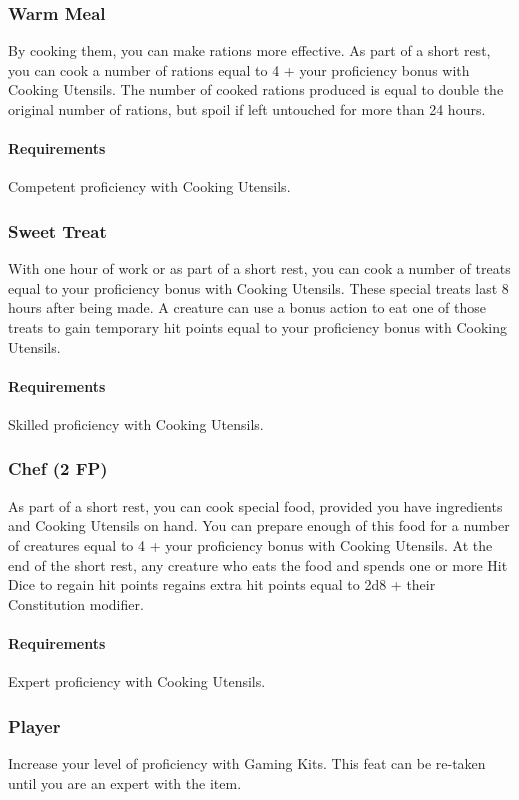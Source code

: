 \subsubsection{Warm Meal} \label{feat::warmmeal}
    By cooking them, you can make rations more effective.
    As part of a short rest, you can cook a number of rations equal to 4 + your proficiency bonus with Cooking Utensils.
    The number of cooked rations produced is equal to double the original number of rations, but spoil if left untouched for more than 24 hours.
    \paragraph{Requirements} Competent proficiency with Cooking Utensils.
\subsubsection{Sweet Treat} \label{feat::sweettreat}
    With one hour of work or as part of a short rest, you can cook a number of treats equal to your proficiency bonus with Cooking Utensils.
    These special treats last 8 hours after being made.
    A creature can use a bonus action to eat one of those treats to gain temporary hit points equal to your proficiency bonus with Cooking Utensils.
    \paragraph{Requirements} Skilled proficiency with Cooking Utensils.
\subsubsection{Chef (2 FP)} \label{feat::chef}
    As part of a short rest, you can cook special food, provided you have ingredients and Cooking Utensils on hand.
    You can prepare enough of this food for a number of creatures equal to 4 + your proficiency bonus with Cooking Utensils.
    At the end of the short rest, any creature who eats the food and spends one or more Hit Dice to regain hit points regains extra hit points equal to 2d8 + their Constitution modifier.
    \paragraph{Requirements} Expert proficiency with Cooking Utensils.
\subsubsection{Player} \label{feat::player}
    Increase your level of proficiency with Gaming Kits.
    This feat can be re-taken until you are an expert with the item.

